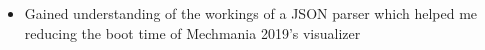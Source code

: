 
\begin{itemize}
  \item Gained understanding of the workings of a JSON parser which helped
  me reducing the boot time of Mechmania 2019’s visualizer
\end{itemize}